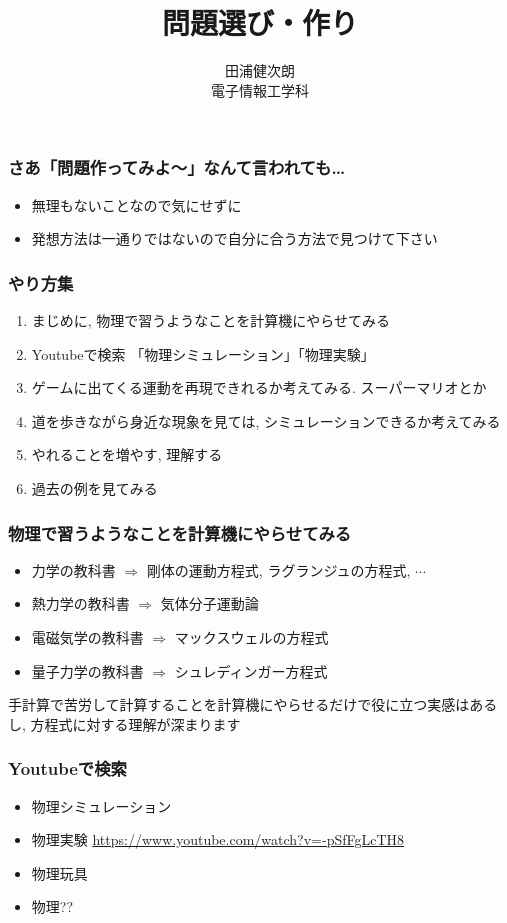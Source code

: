 \documentclass[12pt,dvipdfmx]{beamer}
\title{問題選び・作り}
\institute{東京大学}
\author{田浦健次朗 \\ 電子情報工学科}
\date{}
\begin{document}
\maketitle

\begin{frame}
\frametitle{さあ「問題作ってみよ〜」なんて言われても\ldots}

\begin{itemize}
\item 無理もないことなので気にせずに
\item 発想方法は一通りではないので自分に合う方法で見つけて下さい
\end{itemize}
\end{frame}

\begin{frame}
\frametitle{やり方集}
\begin{enumerate}
\item まじめに, 物理で習うようなことを計算機にやらせてみる
\item Youtubeで検索 「物理シミュレーション」「物理実験」
\item ゲームに出てくる運動を再現できれるか考えてみる. スーパーマリオとか
\item 道を歩きながら身近な現象を見ては, シミュレーションできるか考えてみる
\item やれることを増やす, 理解する
\item 過去の例を見てみる
\end{enumerate}
\end{frame}

\begin{frame}
  \frametitle{物理で習うようなことを計算機にやらせてみる}
  \begin{itemize}
  \item 力学の教科書 $\Rightarrow$ 剛体の運動方程式,
    ラグランジュの方程式, $\cdots$
  \item 熱力学の教科書 $\Rightarrow$ 気体分子運動論
  \item 電磁気学の教科書 $\Rightarrow$ マックスウェルの方程式
  \item 量子力学の教科書 $\Rightarrow$ シュレディンガー方程式
  \end{itemize}
  手計算で苦労して計算することを計算機にやらせるだけで役に立つ実感はあるし,
  方程式に対する理解が深まります
\end{frame}

\begin{frame}
  \frametitle{Youtubeで検索}
  \begin{itemize}
  \item 物理シミュレーション
  \item 物理実験 \url{https://www.youtube.com/watch?v=-pSfFgLcTH8}
  \item 物理玩具
  \item 物理??
  \end{itemize}
\end{frame}
\end{document}
